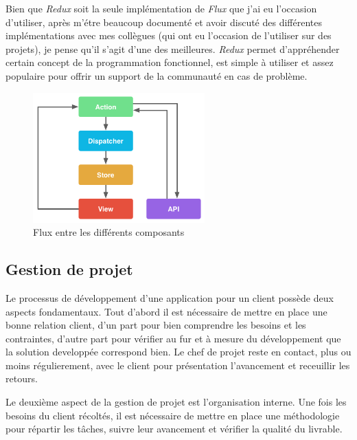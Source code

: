 \documentclass[12pt,a4paper]{article}
\begin{document}
  \bigskip

  Bien que \emph{Redux} soit la seule implémentation de \emph{Flux} que
  j'ai eu l'occasion d'utiliser, après m'étre beaucoup documenté et avoir
  discuté des différentes implémentations avec mes collègues (qui ont eu
  l'occasion de l'utiliser sur des projets), je pense qu'il s'agit d'une
  des meilleures. \emph{Redux} permet d'appréhender certain concept de la
  programmation fonctionnel, est simple à utiliser et assez populaire pour
  offrir un support de la communauté en cas de problème.

  \bigskip

  \begin{figure}[h]
    \centering
    \includegraphics[height=5cm]{figures/react.png}
    \caption{Flux entre les différents composants}
  \end{figure}

  \subsection{Gestion de projet}\label{gestion-de-projet}

  Le processus de développement d'une application pour un client possède
  deux aspects fondamentaux. Tout d'abord il est nécessaire de mettre en
  place une bonne relation client, d'un part pour bien comprendre les
  besoins et les contraintes, d'autre part pour vérifier au fur et à
  mesure du développement que la solution developpée correspond bien. Le
  chef de projet reste en contact, plus ou moins régulierement, avec le
  client pour présentation l'avancement et receuillir les retours.

  \bigskip

  Le deuxième aspect de la gestion de projet est l'organisation interne.
  Une fois les besoins du client récoltés, il est nécessaire de mettre en
  place une méthodologie pour répartir les tâches, suivre leur avancement
  et vérifier la qualité du livrable.

  \bigskip
\end{document}

